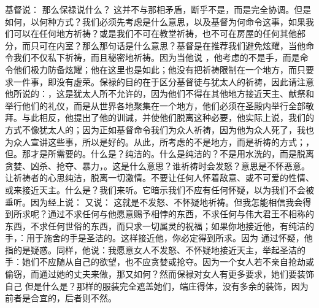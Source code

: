 基督说：  那么保禄说什么？ 这并不与那相矛盾，断乎不是，而是完全协调。但是如何，以何种方式？我们必须先考虑是什么意思，以及基督为何命令这事，如果我们可以在任何地方祈祷？或是我们不可在教堂祈祷，也不可在房屋的任何其他部分，而只可在内室？那么那句话是什么意思？基督是在推荐我们避免炫耀，当他命令我们不仅私下祈祷，而且秘密地祈祷。因为当他说 ，他考虑的不是手，而是命令他们极力防备炫耀；他在这里也是如此；他没有把祈祷限制在一个地方，而只要求一件事，即没有虚荣。保禄的目的在于区分基督徒与犹太人的祈祷，因此请注意他所说的：，这是犹太人所不允许的，因为他们不得在其他地方接近天主、献祭和举行他们的礼仪，而是从世界各地聚集在一个地方，他们必须在圣殿内举行全部敬拜。与此相反，他提出了他的训诫，并使他们脱离这种必要，他实际上说，我们的方式不像犹太人的；因为正如基督命令我们为众人祈祷，因为他为众人死了，我也为众人宣讲这些事，所以是好的。从此，所考虑的不是地方，而是祈祷的方式；，但。那才是所需要的。什么是？纯洁的。什么是纯洁的？不是用水洗的，而是脱离贪婪、凶杀、抢夺、暴力，。这是什么意思？谁祈祷时会发怒？意思是不怀恶意。让祈祷者的心思纯洁，脱离一切激情。不要让任何人怀着敌意、或不可爱的性情、或来接近天主。什么是？我们来听。它暗示我们不应有任何怀疑，以为我们不会被垂听。因为经上说：  又说：  这就是不发怒、不怀疑地祈祷。但我怎能相信我会得到所求呢？通过不求任何与他愿意赐予相悖的东西，不求任何与伟大君王不相称的东西，不求任何世俗的东西，而只求一切属灵的祝福；如果你地接近他，有纯洁的手，：用于施舍的手是圣洁的。这样接近他，你必定得到所求。因为  通过怀疑，他指的是疑惑。同样，他说：我愿意女人不发怒、不怀疑地接近天主，举起圣洁的手：她们不应随从自己的欲望，也不应贪婪或抢夺。因为一个女人若不亲自抢劫或偷窃，而通过她的丈夫来做，那又如何？然而保禄对女人有更多要求，她们要装饰自己 但是什么是？那样的服装完全遮盖她们，端庄得体，没有多余的装饰，因为前者是合宜的，后者则不然。\par

